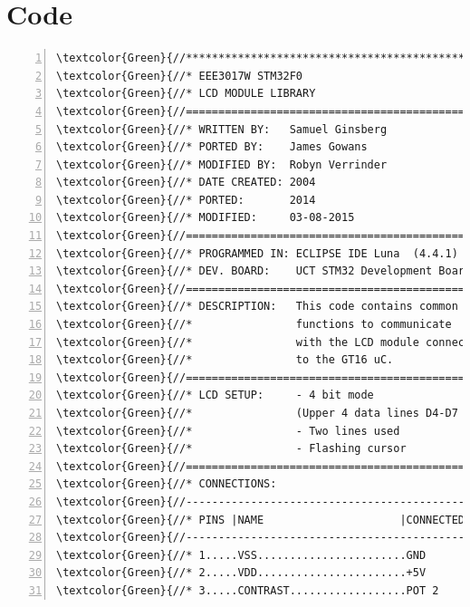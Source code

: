 \section{Code}
\label{sec:appendix.code}
\begin{Verbatim}[fontfamily=courier,fontsize=\small, numbers=left,commandchars=\\\{\}]
\textcolor{Green}{//*************************************************}
\textcolor{Green}{//* EEE3017W STM32F0                              *}
\textcolor{Green}{//* LCD MODULE LIBRARY                            *}
\textcolor{Green}{//=================================================}
\textcolor{Green}{//* WRITTEN BY:   Samuel Ginsberg                 *}
\textcolor{Green}{//* PORTED BY:    James Gowans                    *}
\textcolor{Green}{//* MODIFIED BY:  Robyn Verrinder                 *}
\textcolor{Green}{//* DATE CREATED: 2004                            *}
\textcolor{Green}{//* PORTED:       2014                            *}                         
\textcolor{Green}{//* MODIFIED:     03-08-2015                      *}
\textcolor{Green}{//=================================================}
\textcolor{Green}{//* PROGRAMMED IN: ECLIPSE IDE Luna  (4.4.1)      *}
\textcolor{Green}{//* DEV. BOARD:    UCT STM32 Development Board    *}
\textcolor{Green}{//=================================================}
\textcolor{Green}{//* DESCRIPTION:   This code contains common      *}
\textcolor{Green}{//*                functions to communicate       *}
\textcolor{Green}{//*                with the LCD module connected  *}
\textcolor{Green}{//*                to the GT16 uC.                *}
\textcolor{Green}{//=================================================}
\textcolor{Green}{//* LCD SETUP:     - 4 bit mode                   *}
\textcolor{Green}{//*                (Upper 4 data lines D4-D7 used)*}
\textcolor{Green}{//*                - Two lines used               *}
\textcolor{Green}{//*                - Flashing cursor              *}
\textcolor{Green}{//=================================================}
\textcolor{Green}{//* CONNECTIONS:                                  *}
\textcolor{Green}{//-------------------------------------------------}
\textcolor{Green}{//* PINS |NAME                     |CONNECTED TO  *}
\textcolor{Green}{//-------------------------------------------------}
\textcolor{Green}{//* 1.....VSS.......................GND           *}
\textcolor{Green}{//* 2.....VDD.......................+5V           *}
\textcolor{Green}{//* 3.....CONTRAST..................POT 2         *}

\end{Verbatim}

